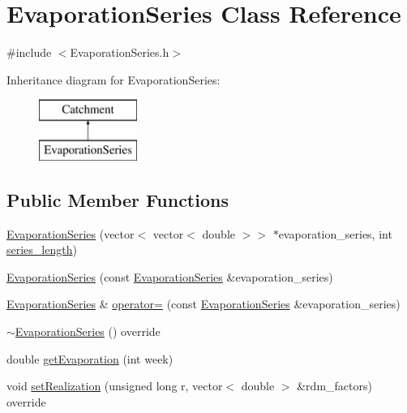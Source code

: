 \hypertarget{classEvaporationSeries}{}\section{Evaporation\+Series Class Reference}
\label{classEvaporationSeries}


{\ttfamily \#include $<$Evaporation\+Series.\+h$>$}

Inheritance diagram for Evaporation\+Series\+:\begin{figure}[H]
\begin{center}
\leavevmode
\includegraphics[height=2.000000cm]{classEvaporationSeries}
\end{center}
\end{figure}
\subsection*{Public Member Functions}
\begin{DoxyCompactItemize}
\item 
\mbox{\hyperlink{classEvaporationSeries_af0903d8555a148f9bf45f915877120b3_af0903d8555a148f9bf45f915877120b3}{Evaporation\+Series}} (vector$<$ vector$<$ double $>$$>$ $\ast$evaporation\+\_\+series, int \mbox{\hyperlink{classCatchment_a2d4994220f63b876348b4ce4892bc6d3_a2d4994220f63b876348b4ce4892bc6d3}{series\+\_\+length}})
\item 
\mbox{\hyperlink{classEvaporationSeries_aa8d8cd8bbc0fd5b368b748cb090ad414_aa8d8cd8bbc0fd5b368b748cb090ad414}{Evaporation\+Series}} (const \mbox{\hyperlink{classEvaporationSeries}{Evaporation\+Series}} \&evaporation\+\_\+series)
\item 
\mbox{\hyperlink{classEvaporationSeries}{Evaporation\+Series}} \& \mbox{\hyperlink{classEvaporationSeries_ad7eb758ce8774ce87732a86c23d24356_ad7eb758ce8774ce87732a86c23d24356}{operator=}} (const \mbox{\hyperlink{classEvaporationSeries}{Evaporation\+Series}} \&evaporation\+\_\+series)
\item 
\mbox{\hyperlink{classEvaporationSeries_a201a00eaaadc9c523d544e0d6a4c50e5_a201a00eaaadc9c523d544e0d6a4c50e5}{$\sim$\+Evaporation\+Series}} () override
\item 
double \mbox{\hyperlink{classEvaporationSeries_a4d793fbcb73e8fb6c179968130d6fd0a_a4d793fbcb73e8fb6c179968130d6fd0a}{get\+Evaporation}} (int week)
\item 
void \mbox{\hyperlink{classEvaporationSeries_a4985ac4c81ec111657861e5750b24c0e_a4985ac4c81ec111657861e5750b24c0e}{set\+Realization}} (unsigned long r, vector$<$ double $>$ \&rdm\+\_\+factors) override
\end{DoxyCompactItemize}
